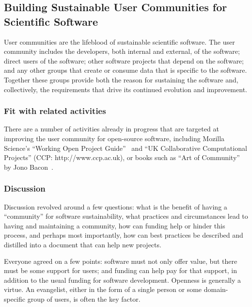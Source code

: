 \subsection{Building Sustainable User Communities for Scientific Software}


User communities are the lifeblood of sustainable scientific software. The user
community includes the developers, both internal and external, of the software;
direct users of the software; other software projects that depend on the
software; and any other groups that create or consume data that is specific to
the software. Together these groups provide both the reason for sustaining the
software and, collectively, the requirements that drive its continued evolution
and improvement.

\subsubsection{Fit with related activities}

There are a number of activities already in progress that are targeted at improving
the user community for open-source software, including Mozilla Science's ``Working Open Project
Guide''~\cite{working-open-wssspe3} and
``UK Collaborative Computational Projects'' (CCP: http://www.ccp.ac.uk), or 
 books such as ``Art of Community'' by Jono Bacon~\cite{art-of-community}. 

\subsubsection{Discussion}

Discussion revolved around a few questions: what is the benefit of having a
``community'' for software sustainability, what practices and circumstances lead
to having and maintaining a community, how can funding help or hinder this
process, and perhaps most importantly, how can best practices be described and
distilled into a document that can help new projects.

Everyone agreed on a few points: software must not only offer value, but there
must be some support for users; and funding can help pay for that support, in
addition to the usual funding for software development. Openness is generally 
a virtue. An evangelist, either in the form of a single person or some
domain-specific group of users, is often the key factor.

